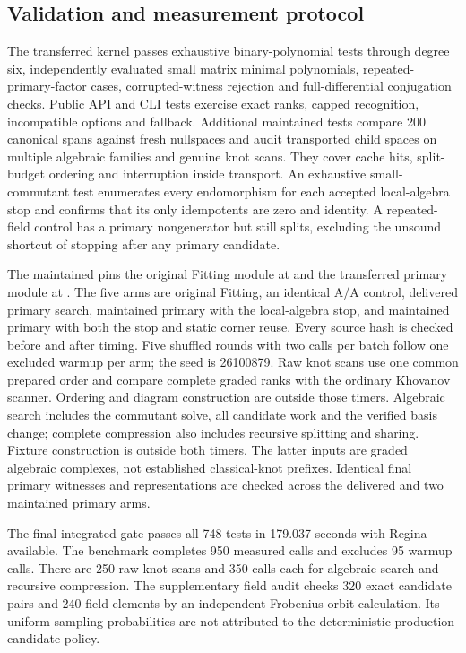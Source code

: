 \subsection{Validation and measurement protocol}
The transferred kernel passes exhaustive binary-polynomial tests through
degree six, independently evaluated small matrix minimal polynomials,
repeated-primary-factor cases, corrupted-witness rejection and full-differential
conjugation checks. Public API and CLI tests exercise exact ranks, capped
recognition, incompatible options and fallback. Additional maintained tests
compare 200 canonical spans against fresh nullspaces and audit transported
child spaces on multiple algebraic families and genuine knot scans. They
cover cache hits, split-budget ordering and interruption inside transport.
An exhaustive small-commutant test enumerates every endomorphism for each
accepted local-algebra stop and confirms that its only idempotents are zero
and identity. A repeated-field control has a primary nongenerator but still
splits, excluding the unsound shortcut of stopping after any primary candidate.

The maintained  pins the original
Fitting module at  and the transferred primary module at
. The five arms are original Fitting, an identical A/A control,
delivered primary search, maintained primary with the local-algebra stop,
and maintained primary with both the stop and static corner reuse. Every
source hash is checked before and after timing. Five shuffled rounds with
two calls per batch follow one excluded warmup per arm; the seed is 26100879.
Raw knot scans use one common prepared order and compare complete graded
ranks with the ordinary Khovanov scanner. Ordering and diagram construction
are outside those timers. Algebraic search includes the commutant solve,
all candidate work and the verified basis change; complete compression also
includes recursive splitting and sharing. Fixture construction is outside
both timers. The latter inputs are graded algebraic complexes, not established
classical-knot prefixes. Identical final primary witnesses and representations
are checked across the delivered and two maintained primary arms.

The final integrated gate passes all 748 tests in 179.037 seconds with Regina
available. The benchmark completes 950 measured calls and excludes 95 warmup
calls. There are 250 raw knot scans and 350 calls each for algebraic search and
recursive compression. The supplementary field audit checks 320 exact candidate
pairs and 240 field elements by an independent Frobenius-orbit calculation.
Its uniform-sampling probabilities are not attributed to the deterministic
production candidate policy.


